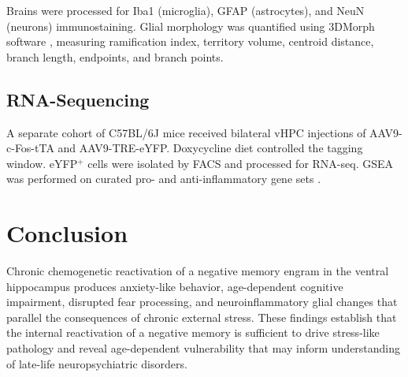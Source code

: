 \documentclass[11pt]{article}
\begin{document}
Brains were processed for Iba1 (microglia), GFAP (astrocytes), and NeuN (neurons) immunostaining. Glial morphology was quantified using 3DMorph software \citep{york2021threedmorph}, measuring ramification index, territory volume, centroid distance, branch length, endpoints, and branch points.

\subsection{RNA-Sequencing}

A separate cohort of C57BL/6J mice received bilateral vHPC injections of AAV9-c-Fos-tTA and AAV9-TRE-eYFP. Doxycycline diet controlled the tagging window. eYFP$^+$ cells were isolated by FACS and processed for RNA-seq. GSEA was performed on curated pro- and anti-inflammatory gene sets \citep{subramanian2005gsea}.

\section{Conclusion}

Chronic chemogenetic reactivation of a negative memory engram in the ventral hippocampus produces anxiety-like behavior, age-dependent cognitive impairment, disrupted fear processing, and neuroinflammatory glial changes that parallel the consequences of chronic external stress. These findings establish that the internal reactivation of a negative memory is sufficient to drive stress-like pathology and reveal age-dependent vulnerability that may inform understanding of late-life neuropsychiatric disorders.



\end{document}
